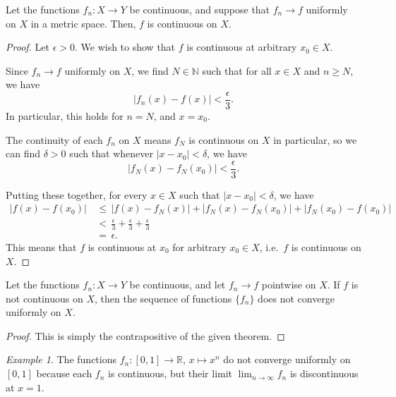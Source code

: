 \documentclass[11pt]{article}
\def\R{\mathbb{R}}
\def\N{\mathbb{N}}
\theoremstyle{definition}
\theoremstyle{remark}
\newtheorem*{example}{Example}
\numberwithin{equation}{module}
\begin{document}
    \begin{theorem}
        Let the functions $f_n\colon X \to Y$ be continuous, and suppose that 
        $f_n \to f$ uniformly on $X$ in a metric space. Then, $f$ is continuous on
        $X$.
    \end{theorem}
    \begin{proof}
        Let $\epsilon > 0$. We wish to show that $f$ is continuous at 
        arbitrary $x_0 \in X$.
        
        Since $f_n \to f$ uniformly on $X$, we find $N \in \N$ such that for all $x
        \in X$ and $n \geq N$, we have \[
            |f_n(x) - f(x)| < \frac{\epsilon}{3}.
        \] In particular, this holds for $n = N$, and $x = x_0$.
        
        The continuity of each $f_n$ on $X$ means $f_N$ is
        continuous on $X$ in particular, so we can find $\delta > 0$ such that 
        whenever $|x - x_0| < \delta$, we have \[
            |f_N(x) - f_N(x_0)| < \frac{\epsilon}{3}.
        \]

        Putting these together, for every $x \in X$ such that $|x - x_0| < \delta$,
        we have
        \begin{align*}
            |f(x) - f(x_0)| 
                \,&\leq\, |f(x) - f_N(x)| + |f_N(x) - f_N(x_0)| + 
                    |f_N(x_0) - f(x_0)| \\
                \,&<\, \frac{\epsilon}{3} + \frac{\epsilon}{3} +
                    \frac{\epsilon}{3} \\
                \,&=\, \epsilon.
        \end{align*}
        This means that $f$ is continuous at $x_0$ for arbitrary $x_0 \in X$, i.e.\
        $f$ is continuous on $X$.
    \end{proof}
    \begin{corollary}
        Let the functions $f_n\colon X \to Y$ be continuous, and let $f_n \to f$
        pointwise on $X$. If $f$ is not continuous on $X$, then the
        sequence of functions $\{f_n\}$ does not converge uniformly on $X$.
    \end{corollary}
    \begin{proof}
        This is simply the contrapositive of the given theorem.
    \end{proof}
    \begin{example}
        The functions $f_n\colon [0, 1] \to \R$, $x \mapsto x^n$ do not converge
        uniformly on $[0, 1]$ because each $f_n$ is continuous, but their limit 
        $\lim_{n \to \infty} f_n$ is discontinuous at $x = 1$.
    \end{example}
\end{document}
